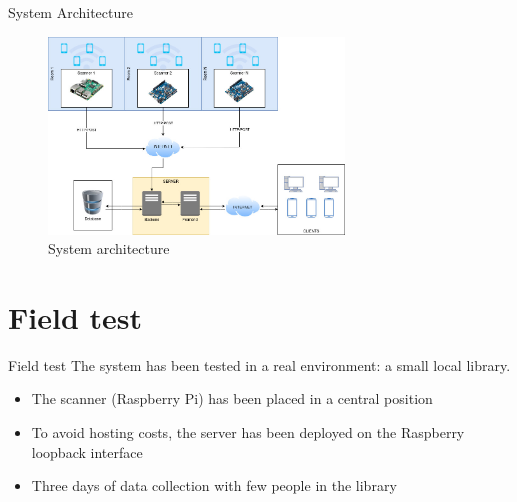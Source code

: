 \documentclass{beamer}
\begin{document}
\begin{frame}{System Architecture}
	\begin{figure}
		\centering
		\includegraphics[width=0.7\textwidth]{images/WNMA-ProjectScheme.jpg}
		\caption{System architecture}
	\end{figure}
\end{frame}

\section{Field test}
\begin{frame}{Field test}
	The system has been tested in a real environment: a small local library.
	\begin{itemize}
		\item The scanner (Raspberry Pi) has been placed in a central position
		\item To avoid hosting costs, the server has been deployed on the Raspberry loopback interface
		\item Three days of data collection with few people in the library
	\end{itemize}
\end{frame}
\end{document}
